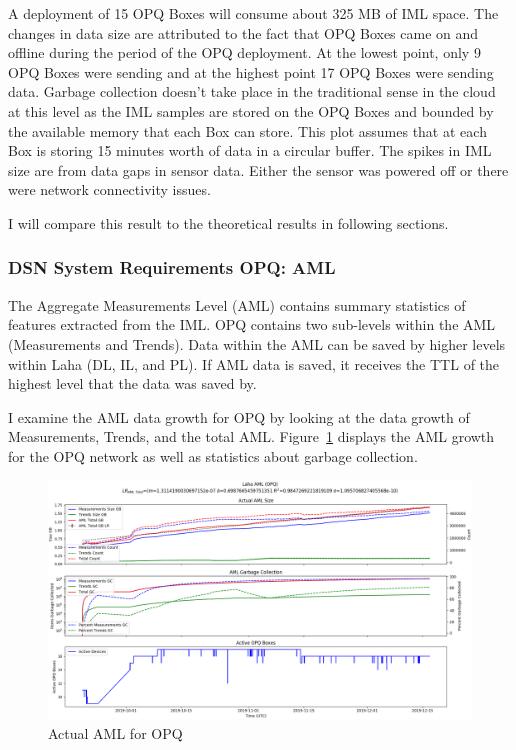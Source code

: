 A deployment of 15 OPQ Boxes will consume about 325 MB of IML space. The changes in data size are attributed to the fact that OPQ Boxes came on and offline during the period of the OPQ deployment. At the lowest point, only 9 OPQ Boxes were sending and at the highest point 17 OPQ Boxes were sending data. Garbage collection doesn't take place in the traditional sense in the cloud at this level as the IML samples are stored on the OPQ Boxes and bounded by the available memory that each Box can store. This plot assumes that at each Box is storing 15 minutes worth of data in a circular buffer. The spikes in IML size are from data gaps in sensor data. Either the sensor was powered off or there were network connectivity issues.

I will compare this result to the theoretical results in following sections.

\subsubsection{DSN System Requirements OPQ: AML}

The Aggregate Measurements Level (AML) contains summary statistics of features extracted from the IML. OPQ contains two sub-levels within the AML (Measurements and Trends). Data within the AML can be saved by higher levels within Laha (DL, IL, and PL). If AML data is saved, it receives the TTL of the highest level that the data was saved by.

I examine the AML data growth for OPQ by looking at the data growth of Measurements, Trends, and the total AML. Figure~\ref{fig:actual_aml_opq} displays the AML growth for the OPQ network as well as statistics about garbage collection.

\begin{figure}[H]
    \centering
    \includegraphics[width=\linewidth]{figures/actual_aml_opq.png}
    \caption{Actual AML for OPQ}
    \label{fig:actual_aml_opq}
\end{figure}

